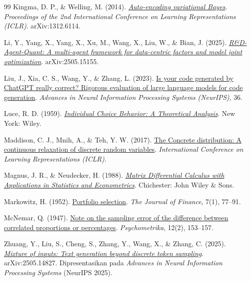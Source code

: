 \begin{thebibliography}{99}
Kingma, D. P., \& Welling, M. (2014).
\href{https://arxiv.org/abs/1312.6114}{\emph{Auto-encoding variational Bayes}}.
\emph{Proceedings of the 2nd International Conference on Learning
Representations (ICLR)}. arXiv:1312.6114.

Li, Y., Yang, X., Yang, X., Xu, M., Wang, X., Liu, W., \& Bian, J. (2025).
\href{https://arxiv.org/abs/2505.15155}{\emph{R\&D-Agent-Quant: A multi-agent
framework for data-centric factors and model joint optimization}}.
arXiv:2505.15155.

Liu, J., Xia, C. S., Wang, Y., \& Zhang, L. (2023).
\href{https://arxiv.org/abs/2305.01210}{Is your code generated by ChatGPT
really correct? Rigorous evaluation of large language models for code
generation}. \emph{Advances in Neural Information Processing Systems
(NeurIPS)}, 36.

Luce, R. D. (1959).
\href{https://archive.org/details/individualchoice0000luce}{\emph{Individual
Choice Behavior: A Theoretical Analysis}}. New York: Wiley.

Maddison, C. J., Mnih, A., \& Teh, Y. W. (2017).
\href{https://arxiv.org/abs/1611.00712}{The Concrete distribution: A continuous
relaxation of discrete random variables}. \emph{International Conference on
Learning Representations (ICLR)}.

Magnus, J. R., \& Neudecker, H. (1988).
\href{https://archive.org/details/matrixdifferenti0000magn}{\emph{Matrix
Differential Calculus with Applications in Statistics and Econometrics}}.
Chichester: John Wiley \& Sons.

Markowitz, H. (1952).
\href{https://doi.org/10.1111/j.1540-6261.1952.tb01525.x}{Portfolio selection}.
\emph{The Journal of Finance}, 7(1), 77--91.

McNemar, Q. (1947).
\href{https://doi.org/10.1007/BF02295996}{Note on the sampling error of the
difference between correlated proportions or percentages}.
\emph{Psychometrika}, 12(2), 153--157.

Zhuang, Y., Liu, S., Cheng, S., Zhang, Y., Wang, X., \& Zhang, C. (2025).
\href{https://arxiv.org/abs/2505.14827}{\emph{Mixture of inputs: Text
generation beyond discrete token sampling}}. arXiv:2505.14827. Dipresentasikan
pada \emph{Advances in Neural Information Processing Systems} (NeurIPS 2025).


\end{thebibliography}
